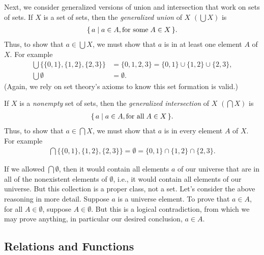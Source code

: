 Next, we consider generalized versions of union and intersection that
work on sets of sets.  If $X$ is a set of sets, then the
\emph{generalized union}
%
%
of $X$ $(\bigcup X)$
%
%
is
\begin{gather*}
\{ \, a \mid a\in A,\allowbreak\mbox{for some}\allowbreak\;A\in X \, \} .
\end{gather*}
Thus, to show that $a\in\bigcup X$, we must show that $a$ is in at
least one element $A$ of $X$.  For example
\begin{align*}
\bigcup\{\{0,1\},\{1,2\},\{2,3\}\} &=
\{0,1,2,3\}=\{0,1\}\cup\{1,2\}\cup\{2,3\}, \\
\bigcup\emptyset &= \emptyset.
\end{align*}
(Again, we rely on set theory's axioms to know this set formation
is valid.)

If $X$ is a \emph{nonempty} set of sets, then the \emph{generalized
intersection}
%
%
of $X$ $(\bigcap X)$
%
%
is
\begin{gather*}
\{ \, a \mid a\in A,\allowbreak\mbox{for all}\allowbreak\;A\in X \, \} .
\end{gather*}
Thus, to show that $a\in\bigcap X$, we must show that
$a$ is in every element $A$ of $X$.
For example
\begin{gather*}
\bigcap\{\{0,1\},\{1,2\},\{2,3\}\} =
\emptyset=\{0,1\}\cap\{1,2\}\cap\{2,3\} .
\end{gather*}

If we allowed $\bigcap\emptyset$, then it would contain all elements
$a$ of our universe that are in all of the nonexistent elements of
$\emptyset$, i.e., it would contain all elements of our universe. But
this collection is a proper class, not a set. Let's consider the above
reasoning in more detail.  Suppose $a$ is a universe element. To prove
that $a\in A$, for all $A\in\emptyset$, suppose $A\in\emptyset$. But this is
a logical contradiction, from which we may prove anything, in particular our
%
%
desired conclusion, $a\in A$.

\subsection{Relations and Functions}

